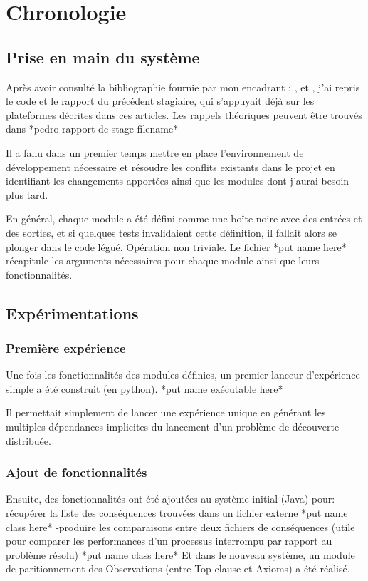 \documentclass{article}
\begin{document}
\section{Chronologie}
\subsection{Prise en main du syst\`eme}

Après avoir consulté la bibliographie fournie par mon encadrant :
\cite{Inoue2006},
\cite{Nabeshima2010} et 
\cite{Bourgne2011},
j'ai repris le code et le rapport du précédent stagiaire, qui s'appuyait déjà sur les plateformes décrites dans ces articles. Les rappels théoriques peuvent être trouvés dans *pedro rapport de stage filename*

Il a fallu dans un premier temps mettre en place l'environnement de développement nécessaire et résoudre les conflits existants dans le projet en identifiant les changements apportées ainsi que les modules dont j'aurai besoin plus tard. 

En général, chaque module a été défini comme une boîte noire avec des entrées et des sorties, et si quelques tests invalidaient cette définition, il fallait alors se plonger dans le code légué. Opération non triviale. Le fichier *put name here* récapitule les arguments nécessaires pour chaque module ainsi que leurs fonctionnalités.


\subsection{Expérimentations}


\subsubsection{Première expérience}
Une fois les fonctionnalités des modules définies, un premier lanceur d'expérience simple a été construit (en python).
*put name exécutable here*

Il permettait simplement de lancer une expérience unique en générant les multiples dépendances implicites du lancement d'un problème de découverte distribuée.

\subsubsection{Ajout de fonctionnalités}
Ensuite, des fonctionnalités ont été ajoutées au système initial (Java) pour:
-récupérer la liste des conséquences trouvées dans un fichier externe
*put name class here*
-produire les comparaisons entre deux fichiers de conséquences (utile pour comparer les performances d'un processus interrompu par rapport au problème résolu)
*put name class here*
Et dans le nouveau système, un module de paritionnement des Observations (entre Top-clause et Axioms) a été réalisé.
\end{document}
